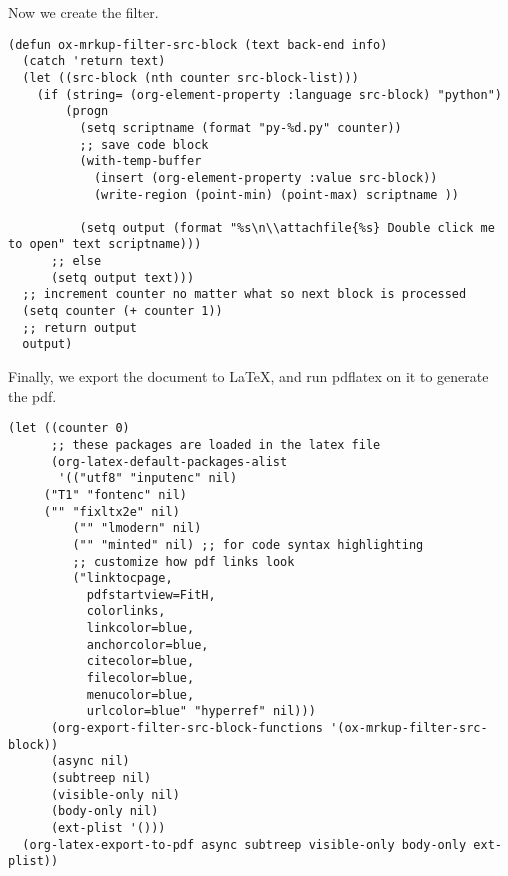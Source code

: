 \documentclass[11pt]{article}
\begin{document}
Now we create the filter. 

\begin{verbatim}
(defun ox-mrkup-filter-src-block (text back-end info)
  (catch 'return text)
  (let ((src-block (nth counter src-block-list)))
    (if (string= (org-element-property :language src-block) "python")
        (progn 
          (setq scriptname (format "py-%d.py" counter))
          ;; save code block
          (with-temp-buffer
            (insert (org-element-property :value src-block))
            (write-region (point-min) (point-max) scriptname ))
         
          (setq output (format "%s\n\\attachfile{%s} Double click me to open" text scriptname)))
      ;; else
      (setq output text)))
  ;; increment counter no matter what so next block is processed
  (setq counter (+ counter 1))
  ;; return output
  output)
\end{verbatim}

Finally, we export the document to \LaTeX{}, and run pdflatex on it to generate the pdf.

\begin{verbatim}
(let ((counter 0)
      ;; these packages are loaded in the latex file
      (org-latex-default-packages-alist 
       '(("utf8" "inputenc" nil)
	 ("T1" "fontenc" nil)
	 ("" "fixltx2e" nil)
         ("" "lmodern" nil)
         ("" "minted" nil) ;; for code syntax highlighting
         ;; customize how pdf links look
         ("linktocpage,
           pdfstartview=FitH,
           colorlinks,
           linkcolor=blue,
           anchorcolor=blue,
           citecolor=blue,
           filecolor=blue,
           menucolor=blue,
           urlcolor=blue" "hyperref" nil)))
      (org-export-filter-src-block-functions '(ox-mrkup-filter-src-block))
      (async nil)
      (subtreep nil)
      (visible-only nil)
      (body-only nil)
      (ext-plist '()))
  (org-latex-export-to-pdf async subtreep visible-only body-only ext-plist))
\end{verbatim}
\end{document}
